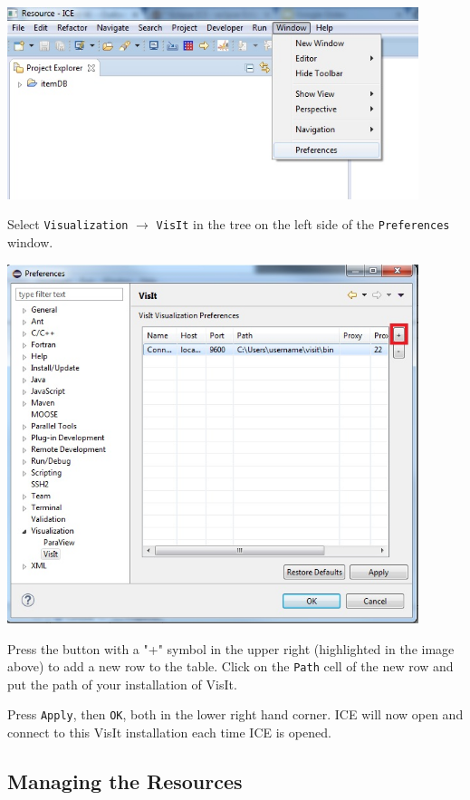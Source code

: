 \documentclass{article}
\begin{document}
\begin{center}
\includegraphics[width=12cm]{images/ICEPreferences}
\end{center}

Select \texttt{Visualization} $\rightarrow$ \texttt{VisIt} in the tree on the
left side of the \texttt{Preferences} window.

\begin{center}
\includegraphics[width=12cm]{images/VisualizationPreferences}
\end{center}

Press the button with a "+" symbol in the upper right (highlighted in the image
above) to add a new row to the table. Click on the \texttt{Path} cell of the new
row and put the path of your installation of VisIt.

Press \texttt{Apply}, then \texttt{OK}, both in the lower right hand corner. ICE
will now open and connect to this VisIt installation each time ICE is opened.

\subsection{Managing the Resources}
\end{document}
